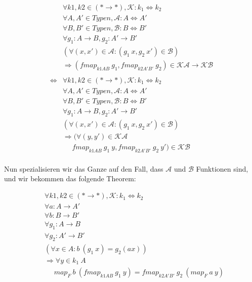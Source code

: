 \begin{align*}
&\forall k1, k2 \in (* \rightarrow *), \mathcal{K} : k_1 \Leftrightarrow k_2 \\
&\forall A, A' \in Typen, \mathcal{A} : A \Leftrightarrow A' \\
&\forall B, B' \in Typen, \mathcal{B} : B \Leftrightarrow B' \\
&\forall g_1 : A \rightarrow B, g_2 : A' \rightarrow B' \\
&(\forall (x, x') \in \mathcal{A}: (g_1\ x, g_2\ x') \in \mathcal{B})\\
&\Rightarrow (fmap_{k1 A B}\ g_1, fmap_{k2 A' B'}\ g_2) \in \mathcal{K} \mathcal{A} \rightarrow \mathcal{K} \mathcal{B} \\
&\\
\Leftrightarrow &\forall k1, k2 \in (* \rightarrow *), \mathcal{K} : k_1 \Leftrightarrow k_2 \\
&\forall A, A' \in Typen, \mathcal{A} : A \Leftrightarrow A' \\
&\forall B, B' \in Typen, \mathcal{B} : B \Leftrightarrow B' \\
&\forall g_1 : A \rightarrow B, g_2 : A' \rightarrow B' \\
&(\forall (x, x') \in \mathcal{A}: (g_1\ x, g_2\ x') \in \mathcal{B})\\
&\Rightarrow (\forall (y, y') \in \mathcal{K} \mathcal{A} \\
&\ \ \ \ \ \ fmap_{k1 A B}\ g_1\ y, fmap_{k2 A' B'}\ g_2\ y') \in \mathcal{K} \mathcal{B}\\
\end{align*}

Nun spezialisieren wir das Ganze auf den Fall, dass $\mathcal{A}$ und $\mathcal{B}$ Funktionen sind, und wir bekommen das
folgende Theorem:

\begin{align*}
&\forall k1, k2 \in (* \rightarrow *), \mathcal{K} : k_1 \Leftrightarrow k_2 \\
&\forall a : A \rightarrow A' \\
&\forall b : B \rightarrow B' \\
&\forall g_1 : A \rightarrow B\\
&\forall g_2 : A' \rightarrow B' \\
&(\forall x \in A : b\ (g_1\ x) = g_2 (a x))\\
&\Rightarrow \forall y \in k_1\ A\\
&\ \ \ \ \ \ map_F\ b\ (fmap_{k1 A B}\ g_1\ y) = fmap_{k2 A' B'}\ g_2\ (map_F\ a\ y)
\end{align*}

